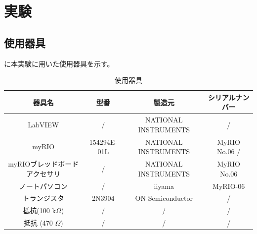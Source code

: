 \documentclass[11pt,dvipdfmx]{jarticle}
\begin{document}
\section{実験}
	\subsection{使用器具}
		に本実験に用いた使用器具を示す。
		\begin{table}[H]
			\centering
			\caption{使用器具}
			\begin{tabular}{|c|c|c|c|}
			\hline
			器具名 & 型番 & 製造元 & シリアルナンバー \\ \hline\hline
			LabVIEW & / & NATIONAL INSTRUMENTS & / \\
			myRIO & 154294E-01L & NATIONAL INSTRUMENTS & MyRIO No.06 / \\
			myRIOブレッドボードアクセサリ & / & NATIONAL INSTRUMENTS & MyRIO No.06 \\ 
			ノートパソコン & /& iiyama & MyRIO-06 \\
			トランジスタ & 2N3904 & ON Semiconductor & / \\
			抵抗(100 k$\Omega $) & / & / & / \\
			抵抗 (470 $\Omega$) & / & / & / \\
			\hline
			\end{tabular}
			\label{tab:使用器具}
		\end{table}
\end{document}
